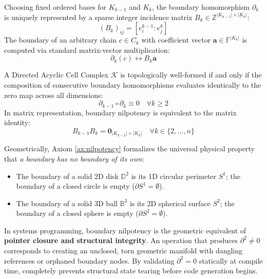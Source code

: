 \begin{definition}
Choosing fixed ordered bases for $K_{k-1}$ and $K_k$, the boundary homomorphism $\partial_k$ is uniquely represented by a sparse integer incidence matrix $B_k \in \mathbb{Z}^{|K_{k-1}| \times |K_k|}$:
\begin{equation}
    (B_k)_{ij} = [e_i^{k-1} : e_j^k]
\end{equation}
The boundary of an arbitrary chain $c \in C_k$ with coefficient vector $\mathbf{a} \in \mathbb{F}^{|K_k|}$ is computed via standard matrix-vector multiplication:
\begin{equation}
    \partial_k(c) \longleftrightarrow B_k \mathbf{a}
\end{equation}
\end{definition}

\begin{axiom}
\label{ax:nilpotency}
A Directed Acyclic Cell Complex $\mathcal{K}$ is topologically well-formed if and only if the composition of consecutive boundary homomorphisms evaluates identically to the zero map across all dimensions:
\begin{equation}
    \partial_{k-1} \circ \partial_k \equiv 0 \quad \forall k \ge 2
\end{equation}
In matrix representation, boundary nilpotency is equivalent to the matrix identity:
\begin{equation}
    B_{k-1} B_k = \mathbf{0}_{|K_{k-2}| \times |K_k|} \quad \forall k \in \{2, \dots, n\}
\end{equation}
\end{axiom}

\begin{remark}
Geometrically, Axiom \ref{ax:nilpotency} formalizes the universal physical property that \textit{a boundary has no boundary of its own}:
\begin{itemize}[leftmargin=1.2cm]
    \item The boundary of a solid 2D disk $\mathbb{D}^2$ is its 1D circular perimeter $S^1$; the boundary of a closed circle is empty ($\partial S^1 = \emptyset$).
    \item The boundary of a solid 3D ball $\mathbb{B}^3$ is its 2D spherical surface $S^2$; the boundary of a closed sphere is empty ($\partial S^2 = \emptyset$).
\end{itemize}
In systems programming, boundary nilpotency is the geometric equivalent of \textbf{pointer closure and structural integrity}. An operation that produces $\partial^2 \neq 0$ corresponds to creating an unclosed, torn geometric manifold with dangling references or orphaned boundary nodes. By validating $\partial^2 = 0$ statically at compile time, \ToposLang{} completely prevents structural state tearing before code generation begins.
\end{remark}

